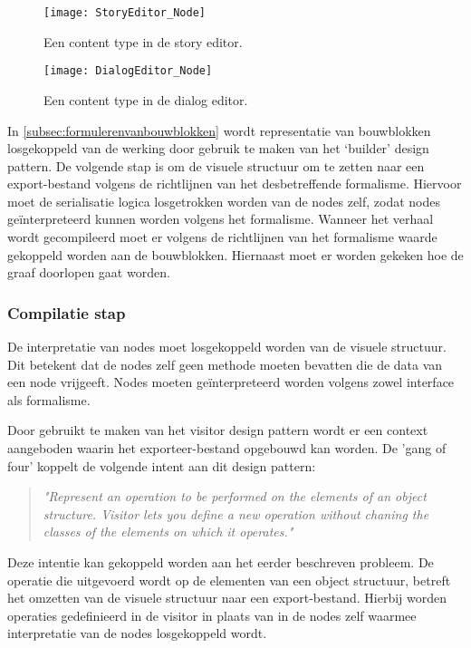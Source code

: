 \begin{figure}[htb]
    \centering    
    \texttt{[image: StoryEditor\_Node]}
    \caption{Een content type in de story editor.}
    \label{fig:storyeditorcontenttype}
\end{figure}

\begin{figure}[htb]
    \centering    
    \texttt{[image: DialogEditor\_Node]}
    \caption{Een content type in de dialog editor.}
    \label{fig:dialogeditorcontenttype}
\end{figure}

In \autoref{subsec:formulerenvanbouwblokken} wordt representatie van bouwblokken losgekoppeld van de werking door gebruik te maken van het ‘builder’ design pattern. De volgende stap is om de visuele structuur om te zetten naar een export-bestand volgens de richtlijnen van het desbetreffende formalisme. Hiervoor moet de serialisatie logica losgetrokken worden van de nodes zelf, zodat nodes geïnterpreteerd kunnen worden volgens het formalisme. Wanneer het verhaal wordt gecompileerd moet er volgens de richtlijnen van het formalisme waarde gekoppeld worden aan de bouwblokken. Hiernaast moet er worden gekeken hoe de graaf doorlopen gaat worden.

\subsubsection{Compilatie stap}
De interpretatie van nodes moet losgekoppeld worden van de visuele structuur. Dit betekent dat de nodes zelf geen methode moeten bevatten die de data van een node vrijgeeft. Nodes moeten geïnterpreteerd worden volgens zowel interface als formalisme. 

Door gebruikt te maken van het visitor design pattern wordt er een context aangeboden waarin het exporteer-bestand opgebouwd kan worden. De 'gang of four' koppelt de volgende intent aan dit design pattern\cite{DesignPatterns}:

\begin{quote} 
    \centering    
    \textit{
        "Represent an operation to be performed on the elements of an object structure. Visitor lets you define a new operation without chaning the classes of the elements on which it operates."     
    }
\end{quote}

Deze intentie kan gekoppeld worden aan het eerder beschreven probleem. De operatie die uitgevoerd wordt op de elementen van een object structuur, betreft het omzetten van de visuele structuur naar een export-bestand. Hierbij worden operaties gedefinieerd in de visitor in plaats van in de nodes zelf waarmee interpretatie van de nodes losgekoppeld wordt.

